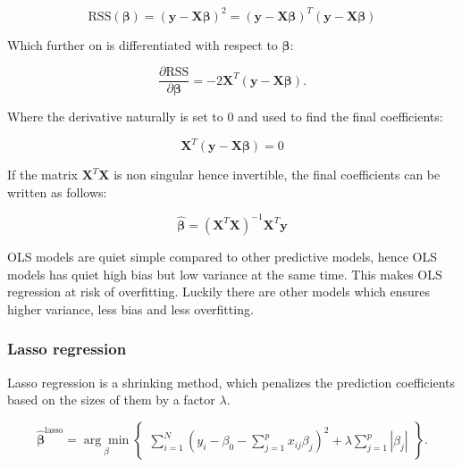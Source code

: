\documentclass[../main.tex]{subfiles}
\begin{document}
\begin{equation*}
  \text{RSS}(\boldsymbol\beta) = (\mathbf y  - \mathbf X\boldsymbol\beta)^2=(\mathbf y  - \mathbf X\boldsymbol\beta)^T(\mathbf y - \mathbf X\boldsymbol\beta) 
\end{equation*}

Which further on is differentiated with respect to $\boldsymbol\beta$:

\begin{equation*}
  \frac{\partial \text{RSS}}{\partial \boldsymbol\beta} = -2\mathbf X^T (\mathbf y - \mathbf X\boldsymbol\beta) .
\end{equation*}

Where the derivative naturally is set to 0 and used to find the final coefficients:

\begin{equation*}
  \mathbf X^T(\mathbf y -\mathbf X\boldsymbol\beta) = 0
\end{equation*}

If the matrix $\boldsymbol X^T \boldsymbol X$ is non singular hence invertible, the final coefficients can be written as follows:

\begin{equation}
  \hat{\boldsymbol{\beta}} = (\mathbf X^T\mathbf X)^{-1}\mathbf X^T \mathbf y
  \label{eq:rss_ols}
\end{equation}

OLS models are quiet simple compared to other predictive models, hence OLS models has quiet high bias but low variance at the same time. This makes OLS regression at risk of overfitting. Luckily there are other models which ensures higher variance, less bias and less overfitting.

\subsubsection{Lasso regression}
Lasso regression is a shrinking method, which penalizes the prediction coefficients based on the sizes of them by a factor  $\lambda$.

\begin{equation}
  \label{eq:L1_algo}
  \hat{\boldsymbol{\beta}}^{\text{lasso}} = \underset{\beta}{\arg \min} \begin{Bmatrix}\sum_{i=1}^N\left(y_i - \beta_0 - \sum_{j=1}^p x_{ij}\beta_j\right)^2 + \lambda \sum_{j=1}^p |\beta_j| \end{Bmatrix} .
\end{equation}
\end{document}

